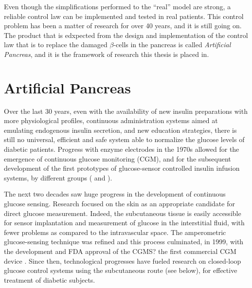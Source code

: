 Even though the simplifications performed to the ``real'' model are strong, a reliable control law can be implemented and tested in real patients. This control problem has been a matter of research for over 40 years, and it is still going on. The product that is edxpected from the design and implementation of the control law that is to replace the damaged $\beta$-cells in the pancreas is called \textit{Artificial Pancreas}, and it is the framework of research this thesis is placed in.

\section{Artificial Pancreas}
\label{sec:ArtificialPancreas}

Over the last 30 years, even with the availability of new insulin preparations with more physiological profiles, continuous administration systems aimed at emulating endogenous insulin secretion, and new education strategies, there is still no universal, efficient and safe system able to normalize the glucose levels of diabetic patients. Progress with enzyme electrodes in the 1970s \cite{williams1970electrochemical} allowed for the emergence of continuous glucose monitoring (CGM), and for the subsequent development of the first prototypes of glucose-sensor controlled insulin infusion systems, by different groups (\cite{albisser1974artificial} and  \cite{albisser1974clinical}). 

The next two decades saw huge progress in the development of continuous glucose sensing. Research focused on the skin as an appropriate candidate for direct glucose measurement. Indeed, the subcutaneous tissue is easily accessible for sensor implantation and measurement of glucose in the interstitial fluid, with fewer problems as compared to the intravascular space. The amperometric glucose-sensing technique was refined and this process culminated, in 1999, with the development and FDA approval of the CGMS? the first commercial CGM device \cite{mastrototaro2000minimed}. Since then, technological progresses have fueled research on closed-loop glucose control systems using the subcutaneous route (see below), for effective treatment of diabetic subjects. 

